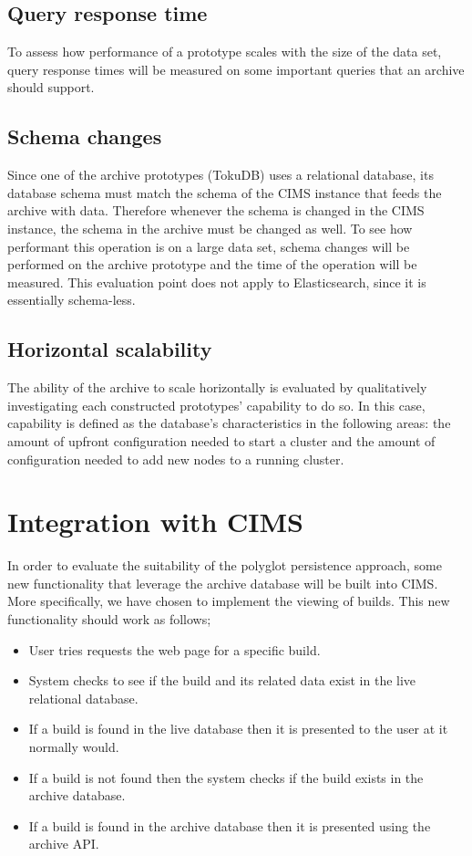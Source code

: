 \subsection{Query response time}
To assess how performance of a prototype scales with the size of the data set, query response times will be measured on some important queries that an archive should support.

\subsection{Schema changes}
Since one of the archive prototypes (TokuDB) uses a relational database, its database schema must match the schema of the CIMS instance that feeds the archive with data. Therefore whenever the schema is changed in the CIMS instance, the schema in the archive must be changed as well. To see how performant this operation is on a large data set, schema changes will be performed on the archive prototype and the time of the operation will be measured. This evaluation point does not apply to Elasticsearch, since it is essentially schema-less.

\subsection{Horizontal scalability}
The ability of the archive to scale horizontally is evaluated by qualitatively investigating each constructed prototypes' capability to do so. In this case, capability is defined as the database's characteristics in the following areas: the amount of upfront configuration needed to start a cluster and the amount of configuration needed to add new nodes to a running cluster.

\section{Integration with CIMS}
In order to evaluate the suitability of the polyglot persistence approach, some new functionality that leverage the archive database will be built into CIMS. More specifically, we have chosen to implement the viewing of builds. This new functionality should work as follows;
\begin{itemize}
\item User tries requests the web page for a specific build.
\item System checks to see if the build and its related data exist in the live relational database.
\item If a build is found in the live database then it is presented to the user at it normally would.
\item If a build is not found then the system checks if the build exists in the archive database. 
\item If a build is found in the archive database then it is presented using the archive API. 
\end{itemize}

